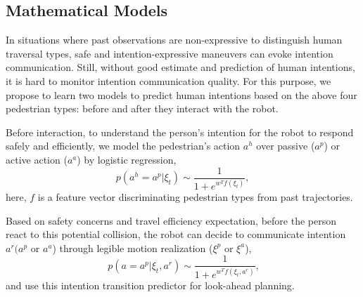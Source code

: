 \documentclass[conference]{IEEEtran}
\begin{document}
\vspace{-.3em}
\subsection{Mathematical Models}
In situations where past observations are non-expressive to 
distinguish human traversal types, safe and 
intention-expressive maneuvers can evoke intention communication. Still, 
without good estimate and prediction of human intentions, it is hard to 
monitor intention communication quality. For this purpose, we propose to learn 
two models to predict human intentions based on the above four pedestrian 
types: before and after they interact with the robot.

Before interaction, to understand the person's intention for the robot to 
respond safely and efficiently, we model the pedestrian's action $a^h$ over 
passive ($a^p$) or active action ($a^a$) by logistic regression,
\begin{equation}
p(a^h=a^p|\xi_t) \sim \frac{1}{1+e^{w^Tf(\xi_t)}},
\end{equation}
here, $f$ is a feature vector discriminating pedestrian types from past trajectories.

Based on safety concerns and travel efficiency expectation, before the person 
react to this potential collision, the robot can 
decide to communicate intention $a^r (a^p$ or $a^a$) through legible motion 
realization ($\xi^p$ or $\xi^a$),
\begin{equation}~\label{eq:transition}
p(a=a^p|\xi_t, a^r) \sim \frac{1}{1+e^{w^Tf(\xi_t,a^r)}},
\end{equation}
and use this intention transition predictor for look-ahead planning.
\end{document}
